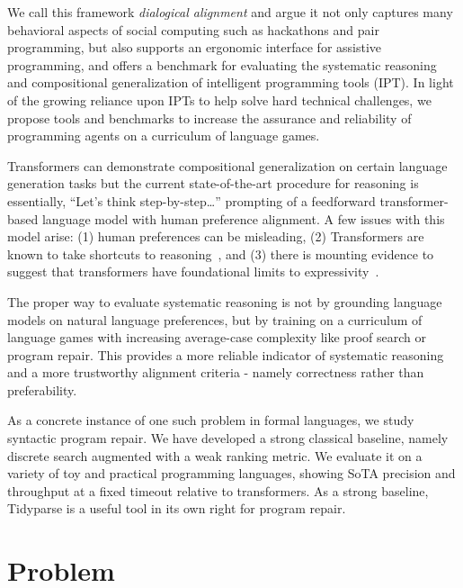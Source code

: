\documentclass[sigplan,screen]{acmart}
\begin{document}
We call this framework \emph{dialogical alignment} and argue it not only captures many behavioral aspects of social computing such as hackathons and pair programming, but also supports an ergonomic interface for assistive programming, and offers a benchmark for evaluating the systematic reasoning and compositional generalization of intelligent programming tools (IPT). In light of the growing reliance upon IPTs to help solve hard technical challenges, we propose tools and benchmarks to increase the assurance and reliability of programming agents on a curriculum of language games.

Transformers can demonstrate compositional generalization on certain language generation tasks but the current state-of-the-art procedure for reasoning is essentially, ``Let's think step-by-step\ldots'' prompting of a feedforward transformer-based language model with human preference alignment. A few issues with this model arise: (1) human preferences can be misleading, (2) Transformers are known to take shortcuts to reasoning~\cite{dziri2023faith, liu2022transformers}, and (3) there is mounting evidence to suggest that transformers have foundational limits to expressivity~\cite{merrill2022saturated, chiang2023tighter}.

The proper way to evaluate systematic reasoning is not by grounding language models on natural language preferences, but by training on a curriculum of language games with increasing average-case complexity like proof search or program repair. This provides a more reliable indicator of systematic reasoning and a more trustworthy alignment criteria - namely correctness rather than preferability.

As a concrete instance of one such problem in formal languages, we study syntactic program repair. We have developed a strong classical baseline, namely discrete search augmented with a weak ranking metric. We evaluate it on a variety of toy and practical programming languages, showing SoTA precision and throughput at a fixed timeout relative to transformers. As a strong baseline, Tidyparse is a useful tool in its own right for program repair.

\section{Problem}

\end{document}
